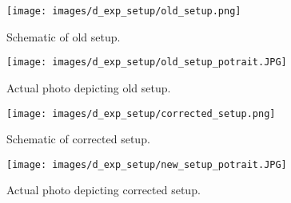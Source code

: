 \begin{figure}[h]
    \centering
    \texttt{[image: images/d\_exp\_setup/old\_setup.png]}
    \caption{Schematic of old setup.}
    \label{fig:old_setup.png}
\end{figure}

\begin{figure}[h]
    \centering
    \texttt{[image: images/d\_exp\_setup/old\_setup\_potrait.JPG]}
    \caption{Actual photo depicting old setup.}
    \label{fig:old_setup_potrait.JPG}
\end{figure}

\begin{figure}[h]
    \centering
    \texttt{[image: images/d\_exp\_setup/corrected\_setup.png]}
    \caption{Schematic of corrected setup.}
    \label{fig:corrected_setup.png}
\end{figure}

\begin{figure}[h]
    \centering
    \texttt{[image: images/d\_exp\_setup/new\_setup\_potrait.JPG]}
    \caption{Actual photo depicting corrected setup.}
    \label{fig:new_setup_potrait.JPG}
\end{figure}

\clearpage
